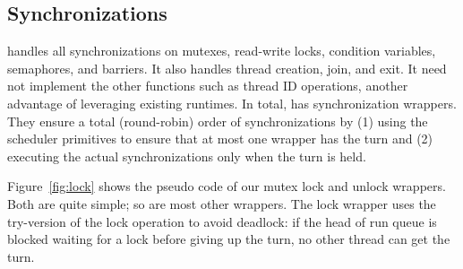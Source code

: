 \subsection{Synchronizations} \label{sec:sync}



\parrot handles all synchronizations on \pthread mutexes, read-write
locks, condition variables, semaphores, and barriers. It also handles thread
creation, join, and exit.  It need not implement the other \pthread
functions such as thread ID operations, another advantage of leveraging
existing \pthread runtimes. In total, \parrot has \npthreadsync synchronization
wrappers.  They ensure a total (round-robin) order of synchronizations by
(1) using the scheduler primitives to ensure that at most one wrapper has
the turn and (2) executing the actual synchronizations only when the turn
is held.



Figure~\ref{fig:lock} shows the pseudo code of our \pthread mutex lock and
unlock wrappers.  Both are quite simple; so are most other wrappers.  The
lock wrapper uses the try-version of the \pthread lock operation to avoid
deadlock: if the head of run queue is blocked waiting for a lock before
giving up the turn, no other thread can get the turn.

